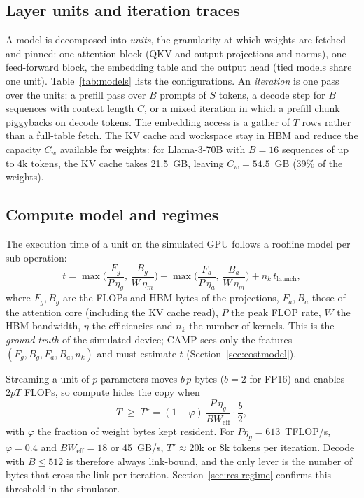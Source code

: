 \documentclass[preprint,12pt]{elsarticle}
\newcommand{\camp}{\textsc{CAMP}}
\newcommand{\bwlink}{BW_{\mathrm{eff}}}
\begin{document}


\subsection{Layer units and iteration traces}
\label{sec:units}

A model is decomposed into \emph{units}, the granularity at which weights are fetched and pinned: one attention block (QKV and output projections and norms), one feed-forward block, the embedding table and the output head (tied models share one unit). Table~\ref{tab:models} lists the configurations. An \emph{iteration} is one pass over the units: a prefill pass over $B$ prompts of $S$ tokens, a decode step for $B$ sequences with context length $C$, or a mixed iteration in which a prefill chunk piggybacks on decode tokens. The embedding access is a gather of $T$ rows rather than a full-table fetch. The KV cache and workspace stay in HBM and reduce the capacity $C_w$ available for weights: for Llama-3-70B with $B{=}16$ sequences of up to 4k tokens, the KV cache takes 21.5~GB, leaving $C_w=54.5$~GB (39\% of the weights).



\subsection{Compute model and regimes}
\label{sec:compute}

The execution time of a unit on the simulated GPU follows a roofline model \cite{williams2009roofline} per sub-operation:
\begin{equation}
t = \max\!\Big(\frac{F_g}{P\,\eta_g},\,\frac{B_g}{W\,\eta_m}\Big) + \max\!\Big(\frac{F_a}{P\,\eta_a},\,\frac{B_a}{W\,\eta_m}\Big) + n_k\,t_{\mathrm{launch}},
\label{eq:roofline}
\end{equation}
where $F_g,B_g$ are the FLOPs and HBM bytes of the projections, $F_a,B_a$ those of the attention core (including the KV cache read), $P$ the peak FLOP rate, $W$ the HBM bandwidth, $\eta$ the efficiencies and $n_k$ the number of kernels. This is the \emph{ground truth} of the simulated device; \camp{} sees only the features $(F_g,B_g,F_a,B_a,n_k)$ and must estimate $t$ (Section~\ref{sec:costmodel}).

Streaming a unit of $p$ parameters moves $b\,p$ bytes ($b=2$ for FP16) and enables $2pT$ FLOPs, so compute hides the copy when
\begin{equation}
T \;\ge\; T^\star = (1-\varphi)\,\frac{P\,\eta_g}{\bwlink}\cdot\frac{b}{2},
\label{eq:threshold}
\end{equation}
with $\varphi$ the fraction of weight bytes kept resident. For $P\eta_g = 613$~TFLOP/s, $\varphi=0.4$ and $\bwlink=18$ or 45~GB/s, $T^\star\approx 20\mathrm{k}$ or $8\mathrm{k}$ tokens per iteration. Decode with $B\le 512$ is therefore always link-bound, and the only lever is the number of bytes that cross the link per iteration. Section~\ref{sec:res-regime} confirms this threshold in the simulator.
\end{document}
